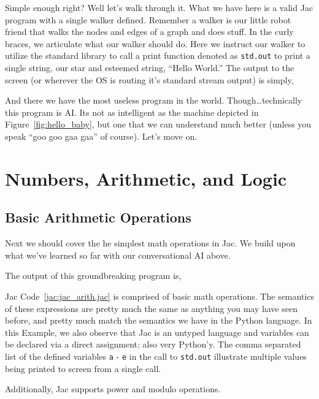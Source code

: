 
Simple enough right? Well let's walk through it. What we have here is a valid Jac program with a single walker defined. Remember a walker is our little robot friend that walks the nodes and edges of a graph and does stuff. In the curly braces, we articulate what our walker should do. Here we instruct our walker to utilize the standard library to call a print function denoted as \lstinline{std.out} to print a single string, our star and esteemed string, ``Hello World.'' The output to the screen (or wherever the OS is routing it's standard stream output) is simply,


And there we have the most useless program in the world. Though\dots technically this program is AI. Its not as intelligent as the machine depicted in Figure~\ref{fig:hello_baby}, but one that we can understand much better (unless you speak ``\gls{goo goo gaa gaa}'' of course). Let's move on.

\section{Numbers, Arithmetic, and Logic}

\subsection{Basic Arithmetic Operations}
Next we should cover the he simplest math operations in Jac. We build upon what we've learned so far with our conversational AI above.


The output of this groundbreaking program is,


Jac Code~\ref{jac:jac_arith.jac} is comprised of basic math operations. The semantics of these expressions are pretty much the same as anything you may have seen before, and pretty much match the semantics we have in the Python language. In this Example, we also observe that Jac is an untyped language and variables can be declared via a direct assignment; also very Python'y. The comma separated list of the defined variables \texttt{a} - \texttt{e} in the call to \lstinline{std.out} illustrate multiple values being printed to screen from a single call.
\par
Additionally, Jac supports power and modulo operations.

